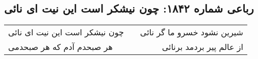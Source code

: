 \begin{center}
\section*{رباعی شماره ۱۸۴۲: چون نیشکر است این نیت ای نائی}
\label{sec:1842}
\begin{longtable}{l p{0.5cm} r}
چون نیشکر است این نیت ای نائی
&&
شیرین نشود خسرو ما گر نائی
\\
هر صبحدم آدم که هر صبحدمی
&&
از عالم پیر بردمد برنائی
\\
\end{longtable}
\end{center}
